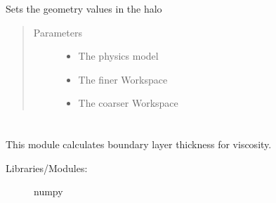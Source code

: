 \documentclass[letterpaper,10pt,english]{sphinxmanual}
\begin{document}
\begin{fulllineitems}
\label{\detokenize{autoapi/bc_transfer/index:bc_transfer.transfer_down}}
\sphinxAtStartPar
Sets the geometry values in the halo
\begin{quote}\begin{description}
\item[{Parameters}] \leavevmode\begin{itemize}
\item {} 
\sphinxAtStartPar
{} \textendash{} The physics model

\item {} 
\sphinxAtStartPar
{} \textendash{} The finer Workspace

\item {} 
\sphinxAtStartPar
{} \textendash{} The coarser Workspace

\end{itemize}

\end{description}\end{quote}

\end{fulllineitems}



\section{}
\label{\detokenize{autoapi/BoundaryThickness/index:module-BoundaryThickness}}\label{\detokenize{autoapi/BoundaryThickness/index:boundarythickness}}\label{\detokenize{autoapi/BoundaryThickness/index::doc}}
\sphinxAtStartPar
This module calculates boundary layer thickness for viscosity.
\begin{description}
\item[{Libraries/Modules:}] \leavevmode
\sphinxAtStartPar
numpy

\end{description}
\end{document}
